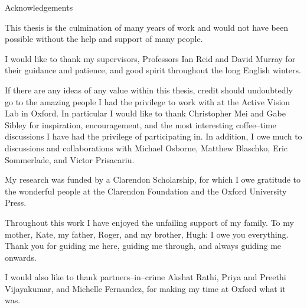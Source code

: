 \vspace*{20mm}
{
\Large\bf
\begin{center}
Acknowledgements
\end{center}
}

This thesis is the culmination of many years of work and would not
have been possible without the help and support of many people.

I would like to thank my supervisors, Professors Ian Reid and David
Murray for their guidance and patience, and good spirit throughout
the long English winters.

If there are any ideas of any value within this thesis, credit should
undoubtedly go to the amazing people I had the privilege to work with
at the Active Vision Lab in Oxford. In particular I would like to
thank Christopher Mei and Gabe Sibley for inspiration, encouragement,
and the most interesting coffee--time discussions I have had the
privilege of participating in. In addition, I owe much to discussions
and collaborations with Michael Osborne, Matthew Blaschko, Eric
Sommerlade, and Victor Prisacariu.

My research was funded by a Clarendon Scholarship, for which I owe
gratitude to the wonderful people at the Clarendon Foundation and the
Oxford University Press.

Throughout this work I have enjoyed the unfailing support of my
family. To my mother, Kate, my father, Roger, and my brother, Hugh: I
owe you everything. Thank you for guiding me here, guiding me through,
and always guiding me onwards.

I would also like to thank partners--in--crime Akshat Rathi, Priya and
Preethi Vijayakumar, and Michelle Fernandez, for
making my time at Oxford what it was.
